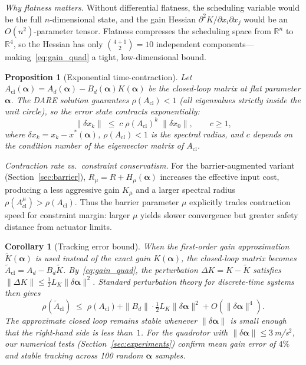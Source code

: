 \documentclass[letterpaper, 10pt, conference]{IEEEtran}
\newtheorem{proposition}{Proposition}
\newtheorem{corollary}{Corollary}
\newcommand{\R}{\mathbb{R}}
\newcommand{\balpha}{\bm{\alpha}}
\begin{document}
\textit{Why flatness matters.}
Without differential flatness, the scheduling variable
would be the full $n$-dimensional state, and the gain
Hessian $\partial^2 K / \partial x_i \partial x_j$ would
be an $O(n^2)$-parameter tensor.
Flatness compresses the scheduling space from $\R^n$ to
$\R^4$, so the Hessian has only $\binom{4+1}{2} = 10$
independent components---making~\eqref{eq:gain_quad}
a tight, low-dimensional bound.

\begin{proposition}[Exponential time-contraction]\label{prop:contraction}
Let $A_{\mathrm{cl}}(\balpha) = A_d(\balpha) - B_d(\balpha) K(\balpha)$
be the closed-loop matrix at flat parameter $\balpha$.
The DARE solution guarantees
$\rho(A_{\mathrm{cl}}) < 1$
(all eigenvalues strictly inside the unit circle),
so the error state contracts exponentially:
\begin{equation}\label{eq:contraction}
  \|\delta x_k\| \;\leq\; c \; \rho(A_{\mathrm{cl}})^k \; \|\delta x_0\|,
  \qquad c \geq 1,
\end{equation}
where $\delta x_k = x_k - x^*(\balpha)$,
$\rho(A_{\mathrm{cl}}) < 1$ is the spectral radius,
and $c$ depends on the condition number of the eigenvector
matrix of $A_{\mathrm{cl}}$.
\end{proposition}

\textit{Contraction rate vs.\ constraint conservatism.}
For the barrier-augmented variant (Section~\ref{sec:barrier}),
$R_\mu = R + H_\mu(\balpha)$ increases the effective input
cost, producing a less aggressive gain $K_\mu$ and a larger
spectral radius $\rho(A_{\mathrm{cl}}^\mu) > \rho(A_{\mathrm{cl}})$.
Thus the barrier parameter $\mu$ explicitly trades contraction
speed for constraint margin: larger $\mu$ yields slower
convergence but greater safety distance from actuator limits.

\begin{corollary}[Tracking error bound]\label{cor:tracking}
When the first-order gain approximation $\tilde{K}(\balpha)$
is used instead of the exact gain $K(\balpha)$,
the closed-loop matrix becomes
$\tilde{A}_{\mathrm{cl}} = A_d - B_d \tilde{K}$.
By~\eqref{eq:gain_quad}, the perturbation
$\Delta K = K - \tilde{K}$ satisfies
$\|\Delta K\| \leq \frac{1}{2} L_K \|\delta\balpha\|^2$.
Standard perturbation theory for discrete-time
systems~\cite{konstantinov1993} then gives
\begin{equation}\label{eq:tracking_bound}
  \rho(\tilde{A}_{\mathrm{cl}})
  \;\leq\; \rho(A_{\mathrm{cl}})
  + \|B_d\| \cdot \tfrac{1}{2} L_K \|\delta\balpha\|^2
  + O(\|\delta\balpha\|^4).
\end{equation}
The approximate closed loop remains stable whenever
$\|\delta\balpha\|$ is small enough that the right-hand
side is less than~$1$.
For the quadrotor with $\|\delta\balpha\| \leq 3$\,m/s$^2$,
our numerical tests (Section~\ref{sec:experiments})
confirm mean gain error of $4\%$ and stable tracking
across 100 random $\balpha$ samples.
\end{corollary}
\end{document}
